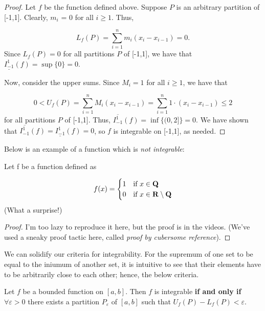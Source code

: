 \documentclass{article}
\begin{document}
  \begin{proof}
    Let \(f\) be the function defined above. Suppose \(P\) is an arbitrary partition of [-1,1]. Clearly, \(m_i\) = 0 for all \(i \geq 1\). Thus,

    \[
      L_f(P) = \sum_{i = 1}^{n}{m_i(x_i - x_{i-1})} = 0.
    \]
    Since \(L_f(P) = 0\) for all partitions \(P\) of [-1,1], we have that \(\underline{I_{-1}^{1}}(f) = \sup\{0\} = 0\).

    Now, consider the upper sums. Since \(M_i = 1\) for all \(i \geq 1\), we have that

    \[
      0 < U_f(P) = \sum_{i = 1}^{n}{M_i(x_i - x_{i-1})} = \sum_{i = 1}^{n}{1 \cdot (x_i - x_{i-1})} \leq 2
    \]
    for all partitions \(P\) of [-1,1]. Thus, \(\overline{I_{-1}^{1}}(f) = \inf\{(0,2]\} = 0\).
    \vspace*{5pt}
    We have shown that \(\overline{I_{-1}^{1}}(f) = \underline{I_{-1}^{1}}(f) = 0\), so \(f\) is integrable on [-1,1], as needed.
  \end{proof}

  Below is an example of a function which is \emph{not integrable}:

  \begin{eg}
    Let f be a function defined as 

    \[
      f(x) = \begin{cases}
        1 & \text{if } x \in \mathbf{Q} \\
        0 & \text{if } x \in \mathbf{R} \setminus \mathbf{Q}
      \end{cases}
    \]
    (What a surprise!)

    \begin{proof}
      I'm too lazy to reproduce it here, but the proof is in the videos. (We've used a sneaky proof tactic here, called \emph{proof by cubersome reference}).
    \end{proof}
    
  \end{eg} 

  We can solidify our criteria for integrability. For the supremum of one set to be equal to the iniumum of another set, it is intuitive to see that their elements have to be arbitrarily close to each other; hence, the below criteria.
  \begin{defi}
    Let \(f\) be a bounded function on \([a,b]\). Then \(f\) is integrable \textbf{if and only if} \(\forall \varepsilon > 0 \) there exists a partition \(P_{\varepsilon}\) of \([a,b]\) such that \(U_f(P) - L_f(P) < \varepsilon\).
  \end{defi}
\end{document}
